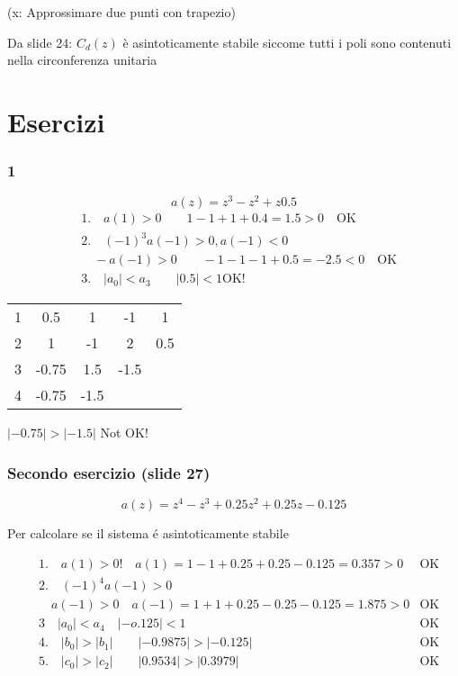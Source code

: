 \documentclass{article}
\begin{document}
(x: Approssimare due  punti con trapezio)

Da slide 24: $C_d(z)$ \`e asintoticamente stabile siccome tutti i poli sono contenuti nella circonferenza unitaria






\newpage
\section{Esercizi}


\subsubsection{1}

\[ a(z) = z^3 - z^2 + z  0.5 \]
\begin{align*}
    &1.\quad a(1) > 0 \qquad 1 - 1 + 1 + 0.4 = 1.5 > 0 \quad \text{OK}\\
    &2.\quad (-1)^3 a(-1) > 0, a(-1) < 0\\
    & \quad -a(-1) > 0 \qquad -1 -1 -1 +0.5 = -2.5 < 0 \quad \text{OK}\\
    &3.\quad  |a_0| < a_3 \qquad |0.5| < 1 \text{OK!}
\end{align*}

\begin{tabular}{c|c c c c}
    1 & 0.5 & 1&  -1 & 1\\
    2 & 1 & -1 & 2 & 0.5\\
    3 & -0.75 & 1.5 & -1.5\\
    4 & -0.75 & -1.5 & &
\end{tabular}

\bigbreak
$|-0.75| > |-1.5|$ Not OK!

\subsubsection{Secondo esercizio (slide 27)}

\[ a(z) = z^4 - z^3 + 0.25 z^2 + 0.25 z - 0.125 \]

Per calcolare se il sistema \'e asintoticamente stabile

\begin{align*}
    &1.\quad  a(1) > 0! \quad a(1) = 1 -1 + 0.25 + 0.25 - 0.125 = 0.357 > 0 & \text{OK}\\
    &2. \quad (-1) ^4 a(-1) > 0 \\
    & \quad a(-1) > 0 \quad a(-1) = 1 + 1 + 0.25 - 0.25 -0.125 = 1.875 > 0 & \text{OK}\\
    &3 \quad |a_0| < a_4 \quad |-o.125| < 1 & \text{OK} \\
    & 4. \quad |b_0| > |b_1| \qquad |-0.9875| > |-0.125| & \text{OK}\\
    & 5.\quad  |c_0| > |c_2| \qquad |0.9534| > |0.3979| & \text{OK}\\
\end{align*}
\end{document}
